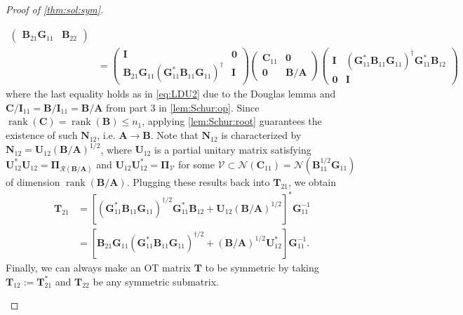 \documentclass[noinfoline]{imsart}\setcounter{tocdepth}{2}
\newcommand{\m}[1]{\mathbf{#1}} %
\renewcommand{\c}[1]{\mathcal{#1}} %
\DeclareMathOperator*{\rk}{rank}
\theoremstyle{plain}
\begin{document}
\begin{proof}[Proof of \cref{thm:sol:sym}]
\begin{enumerate}[leftmargin=*]
\begin{align*}
\begin{pmatrix}
        \m{B}_{21} \m{G}_{11} & \m{B}_{22}
    \end{pmatrix} \\
    &= \begin{pmatrix}
        \m{I} & \m{0} \\
        \m{B}_{21} \m{G}_{11} (\m{G}_{11}^{*} \m{B}_{11} \m{G}_{11})^{\dagger} & \m{I}
    \end{pmatrix}
    \begin{pmatrix}
        \m{C}_{11} & \m{0} \\
        \m{0} & \m{B}/\m{A}
    \end{pmatrix} \begin{pmatrix}
        \m{I} & (\m{G}_{11}^{*} \m{B}_{11} \m{G}_{11})^{\dagger} \m{G}_{11}^{*} \m{B}_{12} \\
        \m{0} & \m{I}
    \end{pmatrix}
\end{align*}
where the last equality holds as in \eqref{eq:LDU2} due to the Douglas lemma and $\m{C}/\m{I}_{11} = \m{B}/\m{I}_{11} = \m{B}/\m{A}$ from part 3 in \cref{lem:Schur:op}.
Since $\rk (\m{C}) = \rk (\m{B}) \le n_{1}$, applying \cref{lem:Schur:root} guarantees the existence of such $\m{N}_{12}$, i.e. $\m{A} \rightarrow \m{B}$. Note that $\m{N}_{12}$ is characterized by $\m{N}_{12} = \m{U}_{12} (\m{B}/\m{A})^{1/2}$,
where $\m{U}_{12}$ is a partial unitary matrix satisfying $\m{U}_{12}^{*} \m{U}_{12} = \m{\Pi}_{\c{R}(\m{B}/\m{A})}$ and $\m{U}_{12} \m{U}_{12}^{*} = \m{\Pi}_{\c{V}}$ for some $\c{V} \subset \c{N}(\m{C}_{11}) = \c{N}(\m{B}_{11}^{1/2} \m{G}_{11})$ of dimension $\rk(\m{B}/\m{A})$. Plugging these results back into $\m{T}_{21}$, we obtain 
\begin{align*}
    \m{T}_{21} &= [(\m{G}_{11}^{*} \m{B}_{11} \m{G}_{11})^{\dagger/2} \m{G}_{11}^{*} \m{B}_{12} + \m{U}_{12} (\m{B}/\m{A})^{1/2}]^{*} \m{G}_{11}^{-1} \\
    &= [\m{B}_{21} \m{G}_{11} (\m{G}_{11}^{*} \m{B}_{11} \m{G}_{11})^{\dagger/2} + (\m{B}/\m{A})^{1/2} \m{U}_{12}^{*}] \m{G}_{11}^{-1}. 
\end{align*}
Finally, we can always make an OT matrix $\m{T}$ to be symmetric by taking $\m{T}_{12} := \m{T}_{21}^{*}$ and $\m{T}_{22}$ be any symmetric submatrix.
\end{enumerate}
\end{proof}
\end{document}
